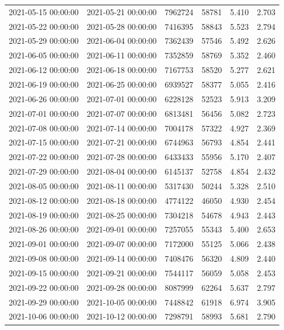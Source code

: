 \begin{tabular}{llrrrr}
2021-05-15 00:00:00 & 2021-05-21 00:00:00 & 7962724 & 58781 & 5.410 & 2.703 \\
2021-05-22 00:00:00 & 2021-05-28 00:00:00 & 7416395 & 58843 & 5.523 & 2.794 \\
2021-05-29 00:00:00 & 2021-06-04 00:00:00 & 7362439 & 57546 & 5.492 & 2.626 \\
2021-06-05 00:00:00 & 2021-06-11 00:00:00 & 7352859 & 58769 & 5.352 & 2.460 \\
2021-06-12 00:00:00 & 2021-06-18 00:00:00 & 7167753 & 58520 & 5.277 & 2.621 \\
2021-06-19 00:00:00 & 2021-06-25 00:00:00 & 6939527 & 58377 & 5.055 & 2.416 \\
2021-06-26 00:00:00 & 2021-07-01 00:00:00 & 6228128 & 52523 & 5.913 & 3.209 \\
2021-07-01 00:00:00 & 2021-07-07 00:00:00 & 6813481 & 56456 & 5.082 & 2.723 \\
2021-07-08 00:00:00 & 2021-07-14 00:00:00 & 7004178 & 57322 & 4.927 & 2.369 \\
2021-07-15 00:00:00 & 2021-07-21 00:00:00 & 6744963 & 56793 & 4.854 & 2.441 \\
2021-07-22 00:00:00 & 2021-07-28 00:00:00 & 6433433 & 55956 & 5.170 & 2.407 \\
2021-07-29 00:00:00 & 2021-08-04 00:00:00 & 6145137 & 52758 & 4.854 & 2.432 \\
2021-08-05 00:00:00 & 2021-08-11 00:00:00 & 5317430 & 50244 & 5.328 & 2.510 \\
2021-08-12 00:00:00 & 2021-08-18 00:00:00 & 4774122 & 46050 & 4.930 & 2.454 \\
2021-08-19 00:00:00 & 2021-08-25 00:00:00 & 7304218 & 54678 & 4.943 & 2.443 \\
2021-08-26 00:00:00 & 2021-09-01 00:00:00 & 7257055 & 55343 & 5.400 & 2.653 \\
2021-09-01 00:00:00 & 2021-09-07 00:00:00 & 7172000 & 55125 & 5.066 & 2.438 \\
2021-09-08 00:00:00 & 2021-09-14 00:00:00 & 7408476 & 56320 & 4.809 & 2.440 \\
2021-09-15 00:00:00 & 2021-09-21 00:00:00 & 7544117 & 56059 & 5.058 & 2.453 \\
2021-09-22 00:00:00 & 2021-09-28 00:00:00 & 8087999 & 62264 & 5.637 & 2.797 \\
2021-09-29 00:00:00 & 2021-10-05 00:00:00 & 7448842 & 61918 & 6.974 & 3.905 \\
2021-10-06 00:00:00 & 2021-10-12 00:00:00 & 7298791 & 58993 & 5.681 & 2.790 \\

\end{tabular}
